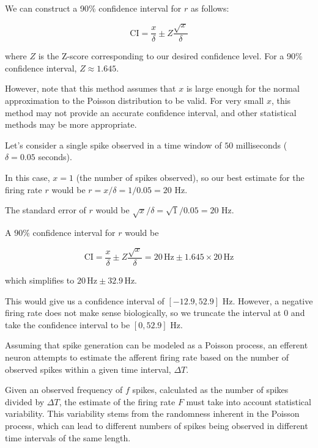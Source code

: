 We can construct a 90\% confidence interval for $r$ as follows:

\begin{equation*}
\text{CI} = \frac{x}{\delta} \pm Z \frac{\sqrt{x}}{\delta}
\end{equation*}

where $Z$ is the Z-score corresponding to our desired confidence level. For a 90\% confidence interval, $Z \approx 1.645$.

However, note that this method assumes that $x$ is large enough for the normal approximation to the Poisson distribution to be valid. For very small $x$, this method may not provide an accurate confidence interval, and other statistical methods may be more appropriate.

Let's consider a single spike observed in a time window of $50$ milliseconds ($\delta = 0.05$ seconds).

In this case, $x = 1$ (the number of spikes observed), so our best estimate for the firing rate $r$ would be $r = x / \delta = 1 / 0.05 = 20$ Hz.

The standard error of $r$ would be $\sqrt{x} / \delta = \sqrt{1} / 0.05 = 20$ Hz.

A $90\%$ confidence interval for $r$ would be

\begin{equation*}
\text{CI} = \frac{x}{\delta} \pm Z \frac{\sqrt{x}}{\delta} = 20 \, \text{Hz} \pm 1.645 \times 20 \, \text{Hz}
\end{equation*}

which simplifies to $20 \, \text{Hz} \pm 32.9 \, \text{Hz}$. 

This would give us a confidence interval of $[-12.9, 52.9]$ Hz. However, a negative firing rate does not make sense biologically, so we truncate the interval at $0$ and take the confidence interval to be $[0, 52.9]$ Hz.


Assuming that spike generation can be modeled as a Poisson process, an efferent neuron attempts to estimate the afferent firing rate based on the number of observed spikes within a given time interval, $\Delta T$. 

Given an observed frequency of $f$ spikes, calculated as the number of spikes divided by $\Delta T$, the estimate of the firing rate $F$ must take into account statistical variability. This variability stems from the randomness inherent in the Poisson process, which can lead to different numbers of spikes being observed in different time intervals of the same length.


